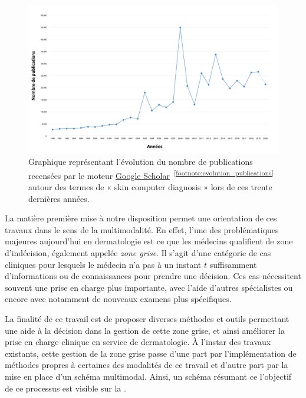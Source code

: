 \begin{figure}[H]
    \centering
    \includegraphics[width=\linewidth]{contents/i_introduction/resources/evolution_publications.pdf}
    \caption{Graphique représentant l'évolution du nombre de publications recensées par le moteur \href{https://scholar.google.fr/}{Google Scholar}~\textsuperscript{\ref{footnote:evolution_publications}} autour des termes de « skin computer diagnosis » lors de ces trente dernières années.}
    \label{fig:evolution_publications}
\end{figure}\par
\addtocounter{footnote}{1}

La matière première mise à notre disposition permet une orientation de ces travaux dans le sens de la multimodalité. En effet, l'une des problématiques majeures aujourd'hui en dermatologie est ce que les médecins qualifient de zone d'indécision, également appelée \textit{zone grise}. Il s'agit d'une catégorie de cas cliniques pour lesquels le médecin n'a pas à un instant $t$ suffisamment d'informations ou de connaissances pour prendre une décision. Ces cas nécessitent souvent une prise en charge plus importante, avec l'aide d'autres spécialistes ou encore avec notamment de nouveaux examens plus spécifiques.\par

La finalité de ce travail est de proposer diverses méthodes et outils permettant une aide à la décision dans la gestion de cette zone grise, et ainsi améliorer la prise en charge clinique en service de dermatologie. À l'instar des travaux existants, cette gestion de la zone grise passe d'une part par l'implémentation de méthodes propres à certaines des modalités de ce travail et d'autre part par la mise en place d'un schéma multimodal. Ainsi, un schéma résumant ce l'objectif de ce processus est visible sur la .\par
\clearpage

